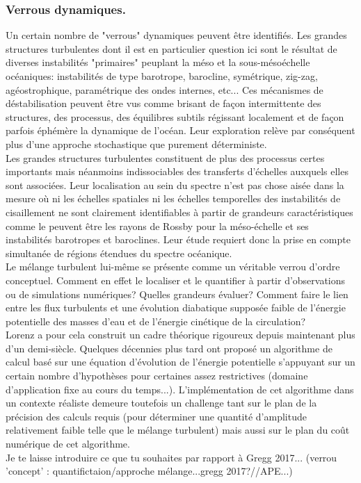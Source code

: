 \subsubsection{Verrous dynamiques.}
Un certain nombre de "verrous" dynamiques peuvent être identifiés. Les grandes structures turbulentes dont il est en particulier question ici sont le résultat de diverses instabilités "primaires" peuplant la méso et la sous-mésoéchelle océaniques: instabilités de type barotrope, barocline, symétrique, zig-zag, agéostrophique, paramétrique des ondes internes, etc... Ces mécanismes de déstabilisation peuvent être vus comme brisant de façon intermittente des structures, des processus, des équilibres subtils régissant localement et de façon parfois éphémère la dynamique de l'océan. Leur exploration relève par conséquent plus d'une approche stochastique que purement déterministe.\\
Les grandes structures turbulentes constituent de plus des processus certes importants mais néanmoins indissociables des transferts d'échelles auxquels elles sont associées. Leur localisation au sein du spectre n'est pas chose aisée dans la mesure où ni les échelles spatiales ni les échelles temporelles des instabilités de cisaillement ne sont clairement identifiables à partir de grandeurs caractéristiques comme le peuvent être les rayons de Rossby pour la méso-échelle et ses instabilités barotropes et baroclines. Leur étude requiert donc la prise en compte simultanée de régions étendues du spectre océanique.\\
\color{green}
Le mélange turbulent lui-même se présente comme un véritable verrou d'ordre conceptuel. Comment en effet le localiser et le quantifier à partir d'observations ou de simulations numériques? Quelles grandeurs évaluer? Comment faire le lien entre les flux turbulents et une évolution diabatique supposée faible de l'énergie potentielle des masses d'eau et de l'énergie cinétique de la circulation?\\
Lorenz \citep{lorenz_available_1955} a pour cela construit un cadre théorique rigoureux depuis maintenant plus d'un demi-siècle. Quelques décennies plus tard \cite{winters_available_1995} ont proposé un algorithme de calcul basé sur une équation d'évolution de l'énergie potentielle s'appuyant sur un certain nombre d'hypothèses pour certaines assez restrictives (domaine d'application fixe au cours du temps...). L'implémentation de cet algorithme dans un contexte réaliste demeure toutefois un challenge tant sur le plan de la précision des calculs requis (pour déterminer une quantité d'amplitude relativement faible telle que le mélange turbulent) mais aussi sur le plan du coût numérique de cet algorithme.\\
Je te laisse introduire ce que tu souhaites par rapport à Gregg 2017...
\color{red}(verrou 'concept' : quantifictaion/approche mélange...gregg 2017?//APE...)\color{black}

